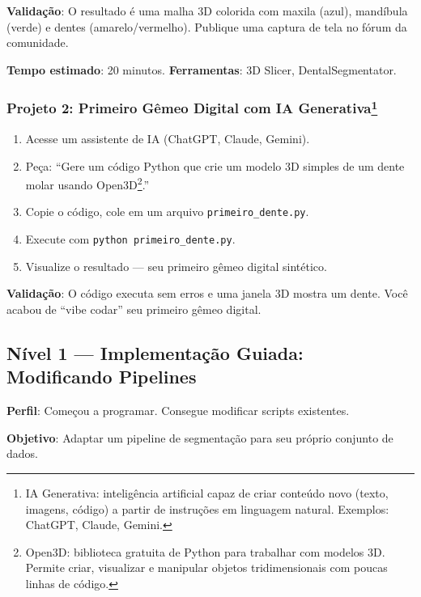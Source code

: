 \textbf{Validação}: O resultado é uma malha 3D colorida com maxila (azul), mandíbula (verde) e dentes (amarelo/vermelho). Publique uma captura de tela no fórum da comunidade.

\textbf{Tempo estimado}: 20 minutos. \textbf{Ferramentas}: 3D Slicer, DentalSegmentator.

\subsubsection*{Projeto 2: Primeiro Gêmeo Digital com IA Generativa\protect\footnote{IA Generativa: inteligência artificial capaz de criar conteúdo novo (texto, imagens, código) a partir de instruções em linguagem natural. Exemplos: ChatGPT, Claude, Gemini.}}

\begin{enumerate}
    \item Acesse um assistente de IA (ChatGPT, Claude, Gemini).
    \item Peça: ``Gere um código Python que crie um modelo 3D simples de um dente molar usando Open3D\protect\footnote{Open3D: biblioteca gratuita de Python para trabalhar com modelos 3D. Permite criar, visualizar e manipular objetos tridimensionais com poucas linhas de código.}.''
    \item Copie o código, cole em um arquivo \texttt{primeiro\_dente.py}.
    \item Execute com \texttt{python primeiro\_dente.py}.
    \item Visualize o resultado --- seu primeiro gêmeo digital sintético.
\end{enumerate}

\textbf{Validação}: O código executa sem erros e uma janela 3D mostra um dente. Você acabou de ``vibe codar'' seu primeiro gêmeo digital.


\subsection{Nível 1 — Implementação Guiada: Modificando Pipelines}

\textbf{Perfil}: Começou a programar. Consegue modificar scripts existentes.

\textbf{Objetivo}: Adaptar um pipeline de segmentação para seu próprio conjunto de dados.

